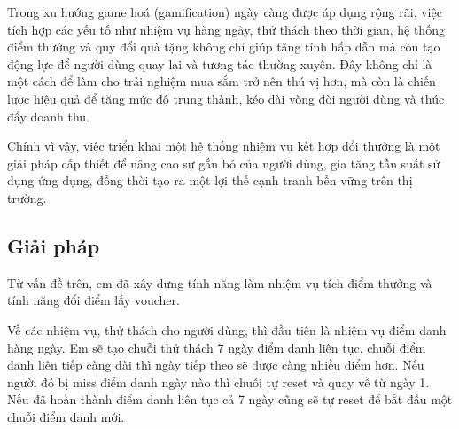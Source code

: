 \documentclass[../DoAn.tex]{subfiles}
\begin{document}
Trong xu hướng game hoá (gamification) ngày càng được áp dụng rộng rãi, việc tích hợp các yếu tố như nhiệm vụ hàng ngày, thử thách theo thời gian, hệ thống điểm thưởng và quy đổi quà tặng không chỉ giúp tăng tính hấp dẫn mà còn tạo động lực để người dùng quay lại và tương tác thường xuyên. Đây không chỉ là một cách để làm cho trải nghiệm mua sắm trở nên thú vị hơn, mà còn là chiến lược hiệu quả để tăng mức độ trung thành, kéo dài vòng đời người dùng và thúc đẩy doanh thu.

Chính vì vậy, việc triển khai một hệ thống nhiệm vụ kết hợp đổi thưởng là một giải pháp cấp thiết để nâng cao sự gắn bó của người dùng, gia tăng tần suất sử dụng ứng dụng, đồng thời tạo ra một lợi thế cạnh tranh bền vững trên thị trường.

\subsection{Giải pháp}
Từ vấn đề trên, em đã xây dựng tính năng làm nhiệm vụ tích điểm thưởng và tính năng đổi điểm lấy voucher.

Về các nhiệm vụ, thử thách cho người dùng, thì đầu tiên là nhiệm vụ điểm danh hàng ngày. Em sẽ tạo chuỗi thử thách 7 ngày điểm danh liên tục, chuỗi điểm danh liên tiếp càng dài thì ngày tiếp theo sẽ được càng nhiều điểm hơn. Nếu người đó bị miss điểm danh ngày nào thì chuỗi tự reset và quay về từ ngày 1. Nếu đã hoàn thành điểm danh liên tục cả 7 ngày cũng sẽ tự reset để bắt đầu một chuỗi điểm danh mới.
\end{document}
